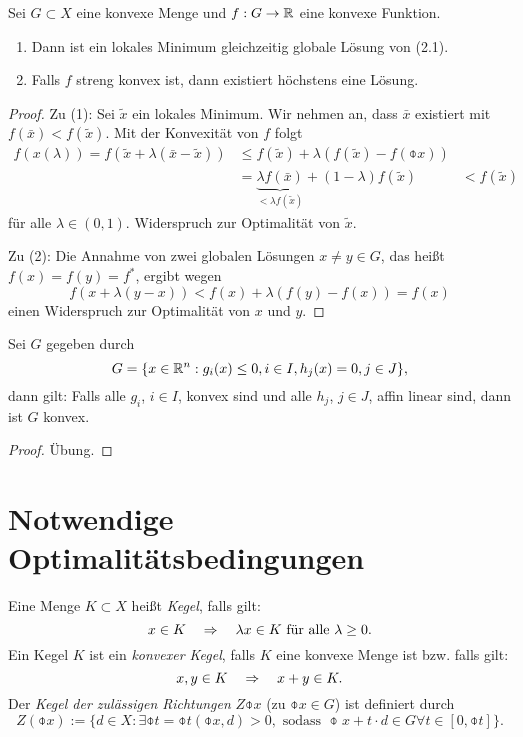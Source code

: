 \begin{thm}
  Sei $G \subset X$ eine konvexe Menge und $f: G \to \mathbb{R}$ eine konvexe
  Funktion.
  \begin{enumerate}[(1)]
  \item Dann ist ein lokales Minimum gleichzeitig globale Lösung von (2.1).
  \item Falls $f$ streng konvex ist, dann existiert höchstens eine Lösung.
  \end{enumerate}
\end{thm}

\begin{proof}
  Zu (1): Sei $\tilde{x}$ ein lokales Minimum. Wir nehmen an, dass $\bar{x}$
  existiert mit $f(\bar{x}) < f(\tilde{x})$. Mit der Konvexität von $f$ folgt
  \[ \begin{aligned}
      f( x(\lambda) ) = f( \tilde{x} + \lambda(\bar{x} - \tilde{x}) )
      &\le f( \tilde{x} ) + \lambda(f(\tilde{x}) - f(\obar{x})) \\
      &= \underbrace{\lambda f( \bar{x} )}_{< \lambda f(\tilde{x})}
      + (1-\lambda) f( \tilde{x} )
      &< f(\tilde{x})
    \end{aligned} \]
  für alle $\lambda \in (0,1)$. Widerspruch zur Optimalität von $\tilde{x}$.

  Zu (2): Die Annahme von zwei globalen Lösungen $x \ne y \in G$, das heißt
  $f(x) = f(y) = f^*$, ergibt wegen
  \[ f(x + \lambda(y-x)) < f(x) + \lambda( f(y) - f(x) ) = f(x) \]
  einen Widerspruch zur Optimalität von $x$ und $y$.
\end{proof}

\begin{aus}
  Sei $G$ gegeben durch
  \[ G = \{ x \in \mathbb{R}^n : g_i(x) \le 0, i \in I, h_j(x) = 0, j \in J \}, \]
  dann gilt: Falls alle $g_i$, $i \in I$, konvex sind und alle $h_j$, $j \in J$,
  affin linear sind, dann ist $G$ konvex.
\end{aus}

\begin{proof}
  Übung.
\end{proof}

\section{Notwendige Optimalitätsbedingungen}
\begin{defn}
  Eine Menge $K \subset X$ heißt \emph{Kegel}, falls gilt:
  \[ x \in K \quad \Rightarrow \quad \lambda x \in K \text{ für alle } \lambda \ge 0. \]
  Ein Kegel $K$ ist ein \emph{konvexer Kegel}, falls $K$ eine konvexe Menge ist
  bzw. falls gilt:
  \[ x,y \in K \quad \Rightarrow \quad x + y \in K. \]
  Der \emph{Kegel der zulässigen Richtungen} $Z{\obar{x}}$ (zu $\obar{x} \in G$)
  ist definiert durch
  \[ Z(\obar{x}) := \{ d \in X : \exists \obar{t} = \obar{t}(\obar{x},d) > 0,
    \text{ sodass } \obar{x} + t \cdot d \in G \forall t \in [0,\obar{t}] \}. \]
\end{defn}

